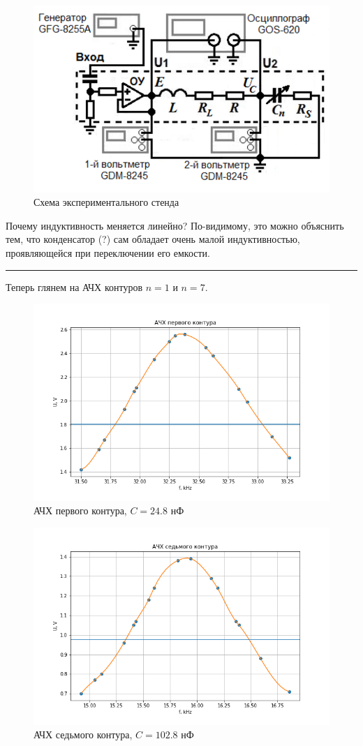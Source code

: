 \documentclass{../lab_class}
\begin{document}
\begin{figure}[H]
\centering
\includegraphics[width = 0.6 \textwidth]{scheme.png}
\caption{Схема экспериментального стенда}
	\label{fig:scheme}
\end{figure}

Почему индуктивность меняется линейно? По-видимому, это можно объяснить тем, что конденсатор (?) сам обладает очень малой индуктивностью, проявляющейся при переключении его емкости.

\bigskip
\hrule
\bigskip

Теперь глянем на АЧХ контуров $n=1$ и $n=7$.

\begin{figure}[H]
	\centering
	\includegraphics[width = 0.82 \textwidth]{freq_response_c1.png}
	\caption{АЧХ первого контура, $C = 24.8$ нФ}
\end{figure}

\begin{figure}[H]
	\centering
	\includegraphics[width = 0.82 \textwidth]{freq_response_c7.png}
	\caption{АЧХ седьмого контура, $C = 102.8$ нФ}
\end{figure}
\end{document}
